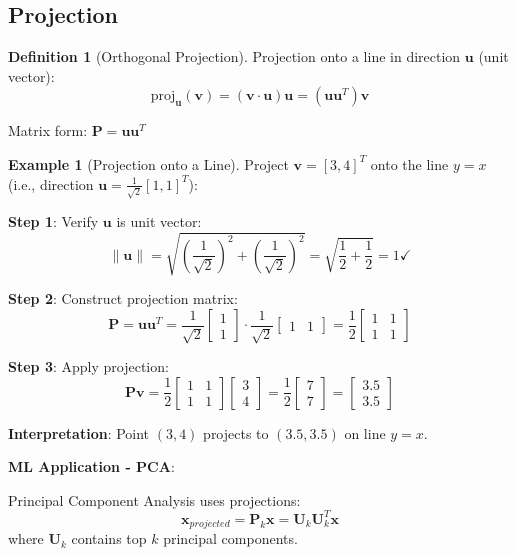 \documentclass[12pt,a4paper]{article}
\theoremstyle{definition}
\newtheorem{definition}{Definition}[section]
\newtheorem{example}{Example}[section]
\begin{document}
\subsection{Projection}

\begin{definition}[Orthogonal Projection]
Projection onto a line in direction $\mathbf{u}$ (unit vector):
\[
\text{proj}_{\mathbf{u}}(\mathbf{v}) = (\mathbf{v} \cdot \mathbf{u})\mathbf{u} = (\mathbf{u}\mathbf{u}^T)\mathbf{v}
\]

Matrix form: $\mathbf{P} = \mathbf{u}\mathbf{u}^T$
\end{definition}

\begin{example}[Projection onto a Line]
Project $\mathbf{v} = [3, 4]^T$ onto the line $y = x$ (i.e., direction $\mathbf{u} = \frac{1}{\sqrt{2}}[1, 1]^T$):

\textbf{Step 1}: Verify $\mathbf{u}$ is unit vector:
\[
\|\mathbf{u}\| = \sqrt{\left(\frac{1}{\sqrt{2}}\right)^2 + \left(\frac{1}{\sqrt{2}}\right)^2} = \sqrt{\frac{1}{2} + \frac{1}{2}} = 1 \checkmark
\]

\textbf{Step 2}: Construct projection matrix:
\[
\mathbf{P} = \mathbf{u}\mathbf{u}^T = \frac{1}{\sqrt{2}}\begin{bmatrix} 1 \\ 1 \end{bmatrix} \cdot \frac{1}{\sqrt{2}}\begin{bmatrix} 1 & 1 \end{bmatrix} = \frac{1}{2}\begin{bmatrix} 1 & 1 \\ 1 & 1 \end{bmatrix}
\]

\textbf{Step 3}: Apply projection:
\[
\mathbf{P}\mathbf{v} = \frac{1}{2}\begin{bmatrix} 1 & 1 \\ 1 & 1 \end{bmatrix} \begin{bmatrix} 3 \\ 4 \end{bmatrix} = \frac{1}{2}\begin{bmatrix} 7 \\ 7 \end{bmatrix} = \begin{bmatrix} 3.5 \\ 3.5 \end{bmatrix}
\]

\textbf{Interpretation}: Point $(3, 4)$ projects to $(3.5, 3.5)$ on line $y=x$.

\textbf{ML Application - PCA}:

Principal Component Analysis uses projections:
\[
\mathbf{x}_{projected} = \mathbf{P}_k\mathbf{x} = \mathbf{U}_k\mathbf{U}_k^T\mathbf{x}
\]
where $\mathbf{U}_k$ contains top $k$ principal components.
\end{example}
\end{document}
